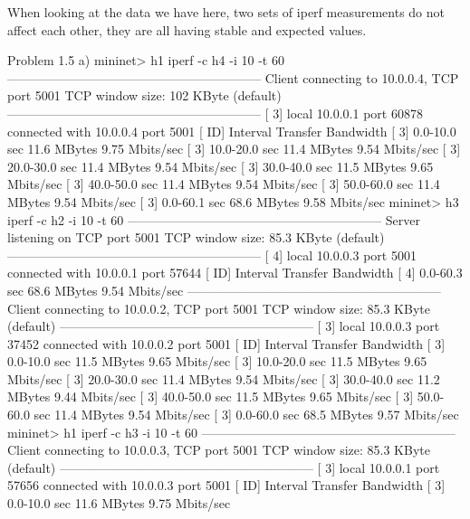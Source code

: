 						When looking at the data we have here, two sets of iperf measurements do not affect each other, they are all having stable and expected values.

Problem 1.5
					a)
						mininet> h1 iperf -c h4 -i 10 -t 60
						------------------------------------------------------------
						Client connecting to 10.0.0.4, TCP port 5001
						TCP window size:  102 KByte (default)
						------------------------------------------------------------
						[  3] local 10.0.0.1 port 60878 connected with 10.0.0.4 port 5001
						[ ID] Interval       Transfer     Bandwidth
						[  3]  0.0-10.0 sec  11.6 MBytes  9.75 Mbits/sec
						[  3] 10.0-20.0 sec  11.4 MBytes  9.54 Mbits/sec
						[  3] 20.0-30.0 sec  11.4 MBytes  9.54 Mbits/sec
						[  3] 30.0-40.0 sec  11.5 MBytes  9.65 Mbits/sec
						[  3] 40.0-50.0 sec  11.4 MBytes  9.54 Mbits/sec
						[  3] 50.0-60.0 sec  11.4 MBytes  9.54 Mbits/sec
						[  3]  0.0-60.1 sec  68.6 MBytes  9.58 Mbits/sec
						mininet> h3 iperf -c h2 -i 10 -t 60
						------------------------------------------------------------
						Server listening on TCP port 5001
						TCP window size: 85.3 KByte (default)
						------------------------------------------------------------
						[  4] local 10.0.0.3 port 5001 connected with 10.0.0.1 port 57644
						[ ID] Interval       Transfer     Bandwidth
						[  4]  0.0-60.3 sec  68.6 MBytes  9.54 Mbits/sec
						------------------------------------------------------------
						Client connecting to 10.0.0.2, TCP port 5001
						TCP window size: 85.3 KByte (default)
						------------------------------------------------------------
						[  3] local 10.0.0.3 port 37452 connected with 10.0.0.2 port 5001
						[ ID] Interval       Transfer     Bandwidth
						[  3]  0.0-10.0 sec  11.5 MBytes  9.65 Mbits/sec
						[  3] 10.0-20.0 sec  11.5 MBytes  9.65 Mbits/sec
						[  3] 20.0-30.0 sec  11.4 MBytes  9.54 Mbits/sec
						[  3] 30.0-40.0 sec  11.2 MBytes  9.44 Mbits/sec
						[  3] 40.0-50.0 sec  11.5 MBytes  9.65 Mbits/sec
						[  3] 50.0-60.0 sec  11.4 MBytes  9.54 Mbits/sec
						[  3]  0.0-60.0 sec  68.5 MBytes  9.57 Mbits/sec
						mininet> h1 iperf -c h3 -i 10 -t 60
						------------------------------------------------------------
						Client connecting to 10.0.0.3, TCP port 5001
						TCP window size: 85.3 KByte (default)
						------------------------------------------------------------
						[  3] local 10.0.0.1 port 57656 connected with 10.0.0.3 port 5001
						[ ID] Interval       Transfer     Bandwidth
						[  3]  0.0-10.0 sec  11.6 MBytes  9.75 Mbits/sec
